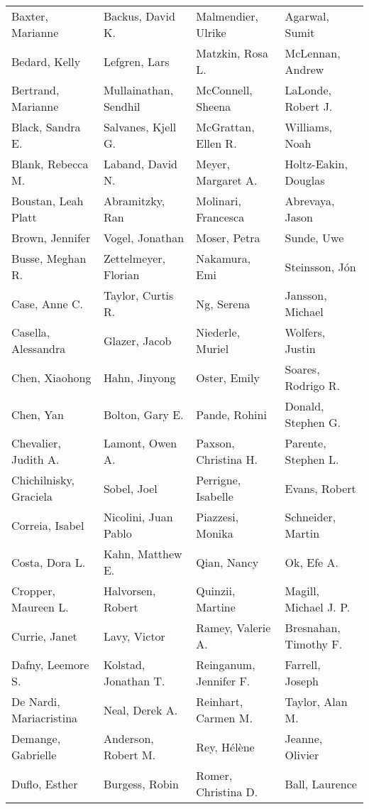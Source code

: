 \begin{ThreePartTable}
{\begin{longtable}[c]{llll}
            Baxter, Marianne&Backus, David K.&Malmendier, Ulrike&Agarwal, Sumit\\
            Bedard, Kelly&Lefgren, Lars&Matzkin, Rosa L.&McLennan, Andrew\\
            Bertrand, Marianne&Mullainathan, Sendhil&McConnell, Sheena&LaLonde, Robert J.\\
            Black, Sandra E.&Salvanes, Kjell G.&McGrattan, Ellen R.&Williams, Noah\\
            Blank, Rebecca M.&Laband, David N.&Meyer, Margaret A.&Holtz-Eakin, Douglas\\
            Boustan, Leah Platt&Abramitzky, Ran&Molinari, Francesca&Abrevaya, Jason\\
            Brown, Jennifer&Vogel, Jonathan&Moser, Petra&Sunde, Uwe\\
            Busse, Meghan R.&Zettelmeyer, Florian&Nakamura, Emi&Steinsson, Jón\\
            Case, Anne C.&Taylor, Curtis R.&Ng, Serena&Jansson, Michael\\
            Casella, Alessandra&Glazer, Jacob&Niederle, Muriel&Wolfers, Justin\\
            Chen, Xiaohong&Hahn, Jinyong&Oster, Emily&Soares, Rodrigo R.\\
            Chen, Yan&Bolton, Gary E.&Pande, Rohini&Donald, Stephen G.\\
            Chevalier, Judith A.&Lamont, Owen A.&Paxson, Christina H.&Parente, Stephen L.\\
            Chichilnisky, Graciela&Sobel, Joel&Perrigne, Isabelle&Evans, Robert\\
            Correia, Isabel&Nicolini, Juan Pablo&Piazzesi, Monika&Schneider, Martin\\
            Costa, Dora L.&Kahn, Matthew E.&Qian, Nancy&Ok, Efe A.\\
            Cropper, Maureen L.&Halvorsen, Robert&Quinzii, Martine&Magill, Michael J. P.\\
            Currie, Janet&Lavy, Victor&Ramey, Valerie A.&Bresnahan, Timothy F.\\
            Dafny, Leemore S.&Kolstad, Jonathan T.&Reinganum, Jennifer F.&Farrell, Joseph\\
            De Nardi, Mariacristina&Neal, Derek A.&Reinhart, Carmen M.&Taylor, Alan M.\\
            Demange, Gabrielle&Anderson, Robert M.&Rey, Hélène&Jeanne, Olivier\\
            Duflo, Esther&Burgess, Robin&Romer, Christina D.&Ball, Laurence\\

\end{longtable}}
\end{ThreePartTable}
